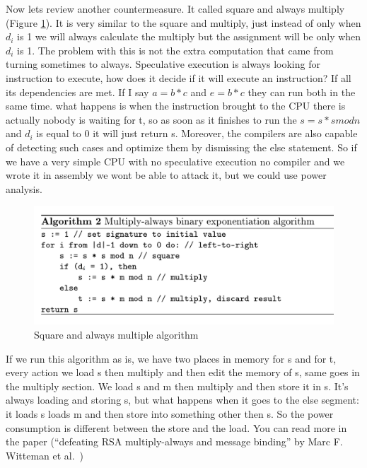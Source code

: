 Now lets review another countermeasure. It called square and always multiply (Figure \ref{saama:fig}). It is very similar to the square and multiply, just instead of only when \(d_i\) is 1 we will always calculate the multiply but the assignment will be only when \(d_i\) is 1. The problem with this is not the extra computation that came from turning sometimes to always. Speculative execution is always looking for instruction to execute, how does it decide if it will execute an instruction? If all its dependencies are met. If I say \(a = b*c\) and \(e = b*c\) they can run both in the same time. what happens is when the instruction brought to the CPU there is actually nobody is waiting for t, so as soon as it finishes to run the \(s =s *s mod n\) and \(d_i\) is equal to 0 it will just return s. Moreover, the compilers are also capable of detecting such cases and optimize them by dismissing the else statement. So if we have a very simple CPU with no speculative execution no compiler and we wrote it in assembly we wont be able to attack it, but we could use power analysis.

\begin{figure}[H]
    \centering
    \includegraphics[scale=0.15]{images/saama.png}
    \caption{Square and always multiple algorithm} \label{saama:fig}
\end{figure}

If we run this algorithm as is, we have two places in memory for s and for t, every action we load s then multiply and then edit the memory of s, same goes in the multiply section. We load s and m then multiply and then store it in s. It’s always loading and storing s, but what happens when it goes to the else segment: it loads s loads m and then store into something other then s. So the power consumption is different between the store and the load. You can read more in the paper (“defeating RSA multiply-always and message binding” by Marc F. Witteman et al.~\cite{witteman2011defeating})

